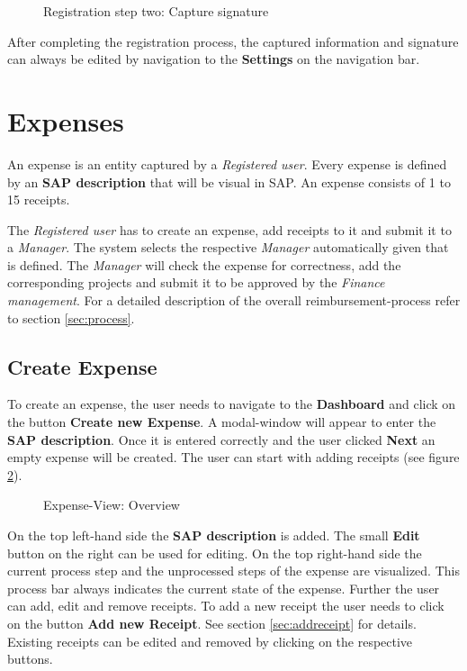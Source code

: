 \begin{figure}[H]
    \centering
    \caption{Registration step two: Capture signature}
    \label{fig:registration-step02}
\end{figure}

After completing the registration process, the captured information and signature can always be edited by navigation to the \textbf{Settings} on the navigation bar.

\section{Expenses}

An expense is an entity captured by a \textit{Registered user}. Every expense is defined by an \textbf{SAP description} that will be visual in SAP. An expense consists of 1 to 15 receipts.

The \textit{Registered user} has to create an expense, add receipts to it and submit it to a \textit{Manager}. The system selects the respective \textit{Manager} automatically given that is defined. The \textit{Manager} will check the expense for correctness, add the corresponding projects and submit it to be approved by the \textit{Finance management}. For a detailed description of the overall reimbursement-process refer to section \ref{sec:process}.

\subsection{Create Expense}

To create an expense, the user needs to navigate to the \textbf{Dashboard} and click on the button \textbf{Create new Expense}. A modal-window will appear to enter the \textbf{SAP description}. Once it is entered correctly and the user clicked \textbf{Next} an empty expense will be created. The user can start with adding receipts (see figure \ref{fig:expensesitems-overview}).

\begin{figure}[H]
    \centering
    \caption{Expense-View: Overview}
    \label{fig:expensesitems-overview}
\end{figure}

On the top left-hand side the \textbf{SAP description} is added. The small \textbf{Edit} button on the right can be used for editing. On the top right-hand side the current process step and the unprocessed steps of the expense are visualized. This process bar always indicates the current state of the expense.\newline
Further the user can add, edit and remove receipts. To add a new receipt the user needs to click on the button \textbf{Add new Receipt}. See section \ref{sec:addreceipt} for details. \newline
Existing receipts can be edited and removed by clicking on the respective buttons.


